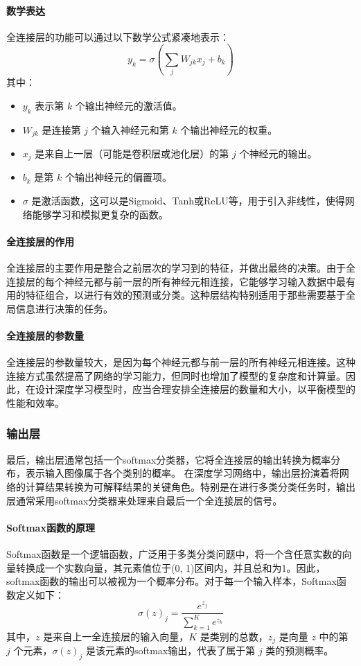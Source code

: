 \documentclass[a4paper,12pt]{article}
\begin{document}
\paragraph{数学表达}
全连接层的功能可以通过以下数学公式紧凑地表示：
\[
y_k = \sigma\left(\sum_{j} W_{jk} x_j + b_k\right)
\]
其中：
\begin{itemize}
	\item \( y_k \) 表示第 \( k \) 个输出神经元的激活值。
	\item \( W_{jk} \) 是连接第 \( j \) 个输入神经元和第 \( k \) 个输出神经元的权重。
	\item \( x_j \) 是来自上一层（可能是卷积层或池化层）的第 \( j \) 个神经元的输出。
	\item \( b_k \) 是第 \( k \) 个输出神经元的偏置项。
	\item \( \sigma \) 是激活函数，这可以是Sigmoid、Tanh或ReLU等，用于引入非线性，使得网络能够学习和模拟更复杂的函数。
\end{itemize}

\paragraph{全连接层的作用}
全连接层的主要作用是整合之前层次的学习到的特征，并做出最终的决策。由于全连接层的每个神经元都与前一层的所有神经元相连接，它能够学习输入数据中最有用的特征组合，以进行有效的预测或分类。这种层结构特别适用于那些需要基于全局信息进行决策的任务。

\paragraph{全连接层的参数量}
全连接层的参数量较大，是因为每个神经元都与前一层的所有神经元相连接。这种连接方式虽然提高了网络的学习能力，但同时也增加了模型的复杂度和计算量。因此，在设计深度学习模型时，应当合理安排全连接层的数量和大小，以平衡模型的性能和效率。


\subsubsection*{输出层}
最后，输出层通常包括一个softmax分类器，它将全连接层的输出转换为概率分布，表示输入图像属于各个类别的概率。
在深度学习网络中，输出层扮演着将网络的计算结果转换为可解释结果的关键角色。特别是在进行多类分类任务时，输出层通常采用softmax分类器来处理来自最后一个全连接层的信号。

\paragraph{Softmax函数的原理}
Softmax函数是一个逻辑函数，广泛用于多类分类问题中，将一个含任意实数的向量转换成一个实数向量，其元素值位于(0, 1)区间内，并且总和为1。因此，softmax函数的输出可以被视为一个概率分布。对于每一个输入样本，Softmax函数定义如下：
\[
\sigma(z)_j = \frac{e^{z_j}}{\sum_{k=1}^K e^{z_k}}
\]
其中，\( z \) 是来自上一全连接层的输入向量，\( K \) 是类别的总数，\( z_j \) 是向量 \( z \) 中的第 \( j \) 个元素，\( \sigma(z)_j \) 是该元素的softmax输出，代表了属于第 \( j \) 类的预测概率。
\end{document}
